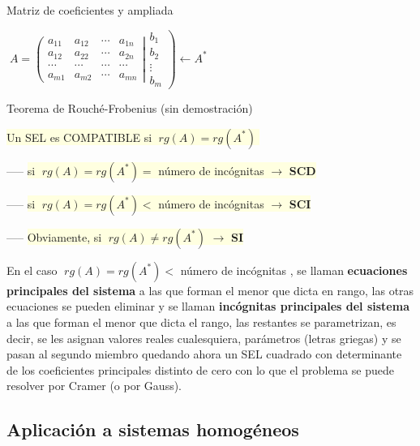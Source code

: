\begin{myblock}{Matriz de coeficientes y ampliada}

\centerline{$\; A=
\left( \begin{matrix}  a_{11}&a_{12}& \cdots &a_{1n} \\
a_{12} &a_{22} &\cdots &a_{2n} \\
\cdots & \cdots & \cdots & \cdots  \\
a_{m1} &a_{m2} &\cdots &a_{mn}    \end{matrix} \right|
\left. \begin{matrix} b_1\\b_2\\ \vdots \\ b_m \end{matrix} \right) \leftarrow A^*\; $}
\end{myblock}

\begin{teor}{Teorema de Rouché-Frobenius} \textcolor{gris}{(sin demostración)}

\vspace{4mm}

\centerline{\colorbox{LightYellow}{Un SEL es COMPATIBLE si $\boxed{\; rg(A)=rg(A^*)\; }$}}

\vspace{2mm}

-----  \colorbox{LightYellow}{si $\; rg(A)=rg(A^*) =$ número de incógnitas $\longrightarrow$ \textbf{SCD}}

-----  \colorbox{LightYellow}{si $\; rg(A)=rg(A^*) <$ número de incógnitas $\longrightarrow $ \textbf{SCI}}

----- \colorbox{LightYellow}{Obviamente, si $\; rg(A) \neq rg(A^*)$ $\longrightarrow $ \textbf{SI}}

En el caso $\; rg(A)=rg(A^*) <$ número de incógnitas , se llaman \textbf{ecuaciones principales del sistema} a las que forman el menor que dicta en rango, las otras ecuaciones se pueden eliminar y se llaman \textbf{incógnitas principales del sistema} a las que forman el menor que dicta el rango, las restantes se parametrizan, es decir, se les asignan valores reales cualesquiera, parámetros (letras griegas) y se pasan al segundo miembro quedando ahora un SEL cuadrado con determinante de los coeficientes principales distinto de cero con lo que el problema se puede resolver por Cramer (o por Gauss).
	
\end{teor}

\subsection{Aplicación a sistemas homogéneos}

